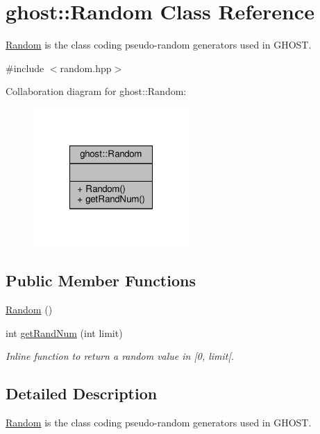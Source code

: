 \hypertarget{classghost_1_1Random}{\section{ghost\-:\-:Random Class Reference}
\label{classghost_1_1Random}
}


\hyperlink{classghost_1_1Random}{Random} is the class coding pseudo-\/random generators used in G\-H\-O\-S\-T.  




{\ttfamily \#include $<$random.\-hpp$>$}



Collaboration diagram for ghost\-:\-:Random\-:
\nopagebreak
\begin{figure}[H]
\begin{center}
\leavevmode
\includegraphics[width=168pt]{classghost_1_1Random__coll__graph}
\end{center}
\end{figure}
\subsection*{Public Member Functions}
\begin{DoxyCompactItemize}
\item 
\hyperlink{classghost_1_1Random_a7c45efd1f7c522a68760104ba6084d89}{Random} ()
\item 
int \hyperlink{classghost_1_1Random_a26f7e445a05839bd89ca9c14f8b34fbc}{get\-Rand\-Num} (int limit)
\begin{DoxyCompactList}\small\item\em Inline function to return a random value in \mbox{[}0, limit\mbox{[}. \end{DoxyCompactList}\end{DoxyCompactItemize}


\subsection{Detailed Description}
\hyperlink{classghost_1_1Random}{Random} is the class coding pseudo-\/random generators used in G\-H\-O\-S\-T. 

